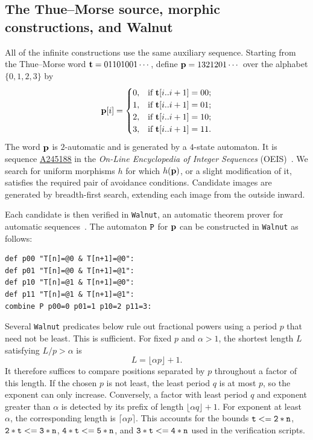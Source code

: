 \documentclass[12pt,reqno]{article}
\newcommand{\seqnum}[1]{\href{https://oeis.org/#1}{\rm \underline{#1}}}
\begin{document}
\subsection{The Thue--Morse source, morphic constructions, and Walnut}
\label{sec:morphic-walnut}

All of the infinite constructions use the same auxiliary sequence.  Starting from the Thue--Morse word ${\bf t}=01101001\cdots$, define ${\bf p}=1321201\cdots$ over the alphabet $\{0,1,2,3\}$ by 
$$ {\bf p}[i] = \begin{cases} 
0, & \text{if } {\bf t}[i..i+1] = 00; \\
1, & \text{if } {\bf t}[i..i+1] = 01; \\
2, & \text{if } {\bf t}[i..i+1] = 10; \\
3, & \text{if } {\bf t}[i..i+1] = 11. 
\end{cases} 
$$ 
The word ${\bf p}$ is $2$-automatic and is generated by a $4$-state automaton.  It is sequence \seqnum{A245188} in the {\it On-Line Encyclopedia of Integer Sequences} (OEIS)~\cite{oeis}.  We search for uniform morphisms $h$ for which $h({\bf p})$, or a slight modification of it, satisfies the required pair of avoidance conditions.  Candidate images are generated by breadth-first search, extending each image from the outside inward.

Each candidate is then verified in {\tt Walnut}, an automatic theorem prover for automatic sequences~\cite{Mousavi:2016,Shallit:2024}.
The automaton $\tt P$ for $\bf p$ can be constructed in {\tt Walnut} as follows: 
\begin{verbatim} 
def p00 "T[n]=@0 & T[n+1]=@0": 
def p01 "T[n]=@0 & T[n+1]=@1": 
def p10 "T[n]=@1 & T[n+1]=@0": 
def p11 "T[n]=@1 & T[n+1]=@1": 
combine P p00=0 p01=1 p10=2 p11=3: 
\end{verbatim}

Several {\tt Walnut} predicates below rule out fractional powers using a period $p$ that need not be least.  This is sufficient.  For fixed $p$ and $\alpha>1$, the shortest length $L$ satisfying $L/p>\alpha$ is
\[
L=\lfloor \alpha p\rfloor+1.
\]
It therefore suffices to compare positions separated by $p$ throughout a factor of this length.  If the chosen $p$ is not least, the least period $q$ is at most $p$, so the exponent can only increase.  Conversely, a factor with least period $q$ and exponent greater than $\alpha$ is detected by its prefix of length $\lfloor\alpha q\rfloor+1$.  For exponent at least $\alpha$, the corresponding length is $\lceil\alpha p\rceil$.  This accounts for the bounds ${\tt t<=2*n}$, ${\tt 2*t<=3*n}$, ${\tt 4*t<=5*n}$, and ${\tt 3*t<=4*n}$ used in the verification scripts.
\end{document}
